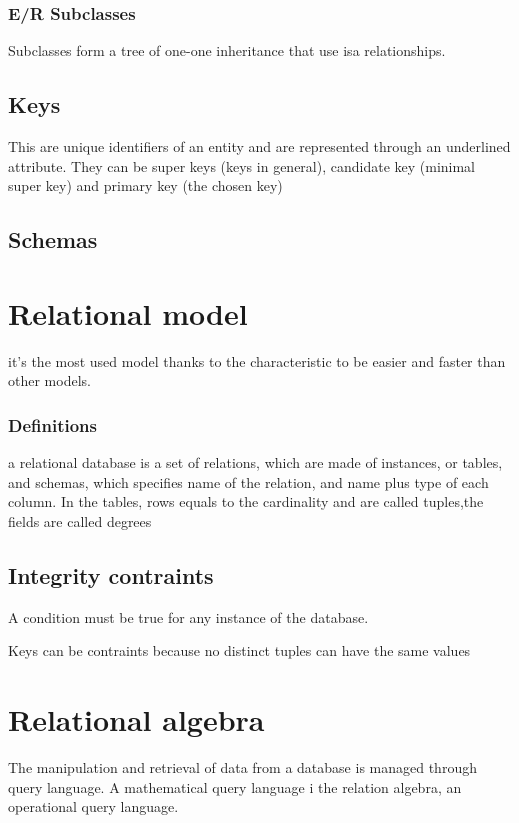 \documentclass[12pt, a4paper]{article}
\begin{document}
\subsubsection*{E/R Subclasses}
Subclasses form a tree of one-one inheritance that use isa relationships. 

\subsection{Keys}
This are unique identifiers of an entity and are represented through an underlined attribute. They can
be super keys (keys in general), candidate key (minimal super key) and primary key (the chosen key)

\subsection{Schemas}

\newpage
\section{Relational model}
it's the most used model thanks to the characteristic to be easier and faster than other models.

\subsubsection*{Definitions}
a relational database is a set of relations, which are made of instances, or tables, and schemas, which specifies
name of the relation, and name plus type of each column. In the tables, rows equals to the cardinality and are 
called tuples,the fields are called degrees

\subsection{Integrity contraints}
A condition must be true for any instance of the database.

Keys can be contraints because no distinct tuples can have the same values 

\newpage
\section{Relational algebra}
The manipulation and retrieval of data from a database is managed through query language. A mathematical query
language i the relation algebra, an operational query language.
\end{document}
